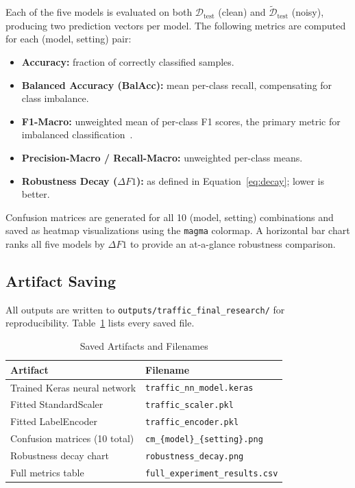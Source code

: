 \documentclass[conference,onecolumn,12pt]{IEEEtran}
\begin{document}
Each of the five models is evaluated on both $\mathcal{D}_{\text{test}}$
(clean) and $\tilde{\mathcal{D}}_{\text{test}}$ (noisy), producing two
prediction vectors per model. The following metrics are computed for each
(model, setting) pair:

\begin{itemize}
  \item \textbf{Accuracy:} fraction of correctly classified samples.
  \item \textbf{Balanced Accuracy (BalAcc):} mean per-class recall,
    compensating for class imbalance.
  \item \textbf{F1-Macro:} unweighted mean of per-class F1 scores, the
    primary metric for imbalanced classification~\cite{kashyap2023}.
  \item \textbf{Precision-Macro / Recall-Macro:} unweighted per-class means.
  \item \textbf{Robustness Decay ($\Delta F1$):} as defined in
    Equation~\eqref{eq:decay}; lower is better.
\end{itemize}

Confusion matrices are generated for all 10 (model, setting)
combinations and saved as heatmap visualizations using the \texttt{magma}
colormap. A horizontal bar chart ranks all five models by $\Delta F1$ to
provide an at-a-glance robustness comparison.

\subsection{Artifact Saving}

All outputs are written to \texttt{outputs/traffic\_final\_research/} for
reproducibility. Table~\ref{tab:artifacts} lists every saved file.

\begin{table}[h]
  \centering
  \caption{Saved Artifacts and Filenames}
  \label{tab:artifacts}
  \renewcommand{\arraystretch}{1.2}
  \begin{tabular}{ll}
    \toprule
    \textbf{Artifact} & \textbf{Filename} \\
    \midrule
    Trained Keras neural network  & \texttt{traffic\_nn\_model.keras} \\
    Fitted StandardScaler         & \texttt{traffic\_scaler.pkl} \\
    Fitted LabelEncoder           & \texttt{traffic\_encoder.pkl} \\
    Confusion matrices (10 total) & \texttt{cm\_\{model\}\_\{setting\}.png} \\
    Robustness decay chart        & \texttt{robustness\_decay.png} \\
    Full metrics table            & \texttt{full\_experiment\_results.csv} \\
    \bottomrule
  \end{tabular}
\end{table}
\end{document}
